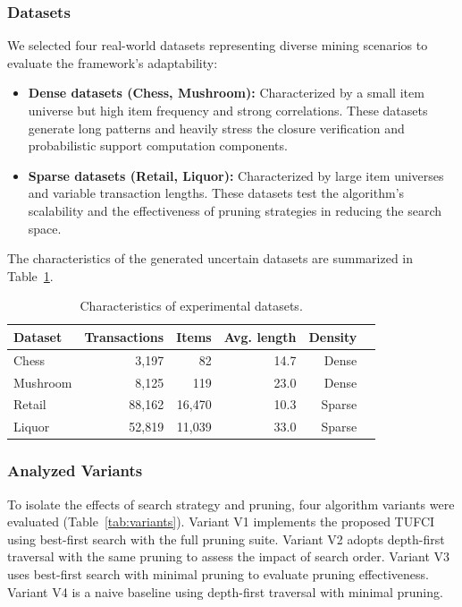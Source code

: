 \documentclass[10pt,letterpaper]{article}
\begin{document}
\subsubsection*{Datasets}

We selected four real-world datasets representing diverse mining scenarios to evaluate the framework's adaptability:

\begin{itemize}
    \item \textbf{Dense datasets (Chess, Mushroom):} Characterized by a small item universe but high item frequency and strong correlations. These datasets generate long patterns and heavily stress the closure verification and probabilistic support computation components.
    \item \textbf{Sparse datasets (Retail, Liquor):} Characterized by large item universes and variable transaction lengths. These datasets test the algorithm's scalability and the effectiveness of pruning strategies in reducing the search space.
\end{itemize}

The characteristics of the generated uncertain datasets are summarized in Table~\ref{tab:datasets}.

\begin{table}[H]
\centering
\caption{Characteristics of experimental datasets.}
\label{tab:datasets}
\begin{tabular}{lrrrrl}
\hline
\textbf{Dataset} & \textbf{Transactions} & \textbf{Items} & \textbf{Avg. length} & \textbf{Density} \\
\hline
Chess      & 3,197  & 82     & 14.7  & Dense \\
Mushroom   & 8,125  & 119    & 23.0  & Dense \\
Retail     & 88,162 & 16,470 & 10.3  & Sparse \\
Liquor     & 52,819 & 11,039 & 33.0  & Sparse \\
\hline
\end{tabular}
\end{table}

\subsubsection*{Analyzed Variants}

To isolate the effects of search strategy and pruning, four algorithm variants were evaluated (Table~\ref{tab:variants}). Variant V1 implements the proposed TUFCI using best-first search with the full pruning suite. Variant V2 adopts depth-first traversal with the same pruning to assess the impact of search order. Variant V3 uses best-first search with minimal pruning to evaluate pruning effectiveness. Variant V4 is a naive baseline using depth-first traversal with minimal pruning.
\end{document}
